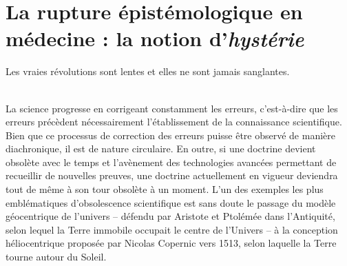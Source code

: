 \section{La rupture épistémologique en médecine : la notion d'\textit{hystérie}}
\begin{myepigraph}
\small
\og{}Les vraies révolutions sont lentes et elles ne sont jamais sanglantes.\fg{}\\[-1ex]
\\ 
\end{myepigraph}
\medskip
La science progresse en corrigeant constamment les erreurs, c'est-à-dire que les erreurs précèdent nécessairement l'établissement de la connaissance scientifique. Bien que ce processus de correction des erreurs puisse être observé de manière diachronique, il est de nature circulaire. En outre, si une doctrine devient obsolète avec le temps et l'avènement des technologies avancées permettant de recueillir de nouvelles preuves, une doctrine actuellement en vigueur deviendra tout de même à son tour obsolète à un moment. L'un des exemples les plus emblématiques d'obsolescence scientifique est sans doute le passage du modèle géocentrique de l'univers -- défendu par Aristote et Ptolémée dans l'Antiquité, selon lequel la Terre immobile occupait le centre de l'Univers -- à la conception héliocentrique proposée par Nicolas Copernic vers 1513, selon laquelle la Terre tourne autour du Soleil. 



